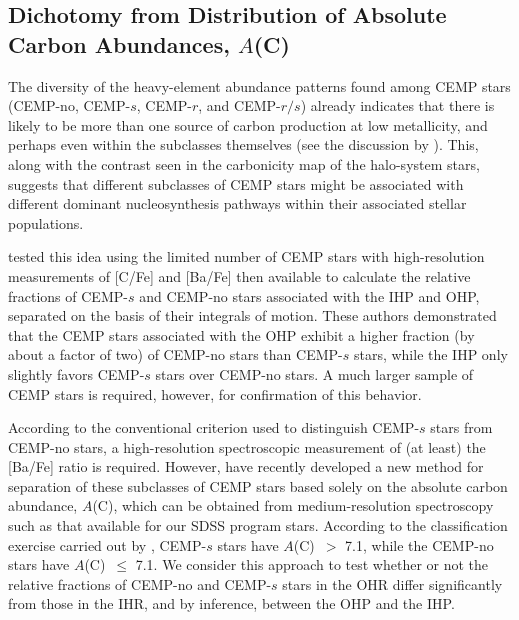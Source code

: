 \documentclass[iop]{emulateapj}
\newcommand*{\ac}{$A$(C)}
\begin{document}
\subsection{Dichotomy from Distribution of Absolute Carbon Abundances, $A$(C)}

The diversity of the heavy-element abundance patterns
found among CEMP stars (CEMP-no, CEMP-$s$, CEMP-$r$, and CEMP-$r/s$)
already indicates that there is likely to be more than one source
of carbon production at low metallicity, and perhaps even within the
subclasses themselves (see the discussion by \citealt{yoon2016}). This,
along with the contrast seen in the carbonicity map of the
halo-system stars, suggests that different subclasses of CEMP stars
might be associated with different dominant nucleosynthesis pathways
within their associated stellar populations.

\citet{carollo2014} tested this idea using the limited number of
CEMP stars with high-resolution measurements of [C/Fe] and [Ba/Fe] then
available to calculate the relative fractions of CEMP-$s$ and CEMP-no
stars associated with the IHP and OHP, separated on the basis of their
integrals of motion. These authors demonstrated that the CEMP stars
associated with the OHP exhibit a higher fraction (by about a factor of two)
of CEMP-no stars than CEMP-$s$ stars, while the IHP only
slightly favors CEMP-$s$ stars over CEMP-no stars. A much larger sample
of CEMP stars is required, however, for confirmation of this
behavior.

According to the conventional criterion used to distinguish CEMP-$s$
stars from CEMP-no stars, a high-resolution spectroscopic measurement of
(at least) the [Ba/Fe] ratio is required.  However, \citet{yoon2016}
have recently developed a new method for separation of these subclasses
of CEMP stars based solely on the absolute carbon abundance, $A$(C),
which can be obtained from medium-resolution spectroscopy such as that
available for our SDSS program stars. According to the classification
exercise carried out by \citet{yoon2016}, CEMP-$s$ stars have
\ac\ $>$ 7.1, while the CEMP-no stars have \ac\ $\le$ 7.1.
We consider this approach to test whether or not the
relative fractions of CEMP-no and CEMP-$s$ stars in the OHR differ
significantly from those in the IHR, and by inference, between the OHP
and the IHP.
\end{document}

